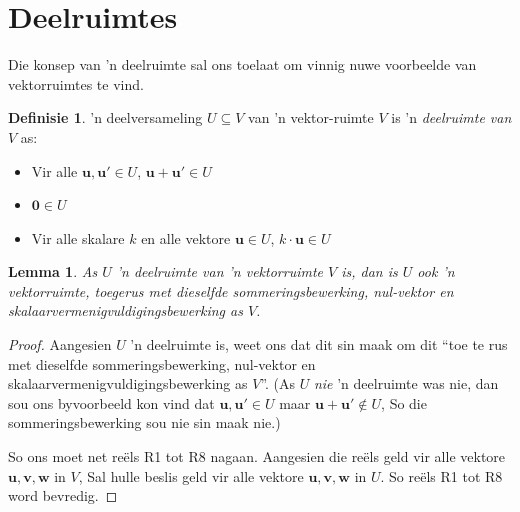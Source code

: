 \documentclass[a4paper,11pt]{book}
\newtheorem{lemma}[theorem]{Lemma}
\theoremstyle{definition}
\newtheorem{definition}[theorem]{Definisie}
\newcommand{\ve}[1]{\mathbf{#1}}
\begin{document}
\section{Deelruimtes}
Die konsep van 'n deelruimte sal ons toelaat om vinnig nuwe voorbeelde van
vektorruimtes te vind.
\begin{definition}'n deelversameling $U \subseteq V$ van 'n vektor-ruimte
	$V$ is 'n \emph{deelruimte van $V$} as:
	\begin{itemize}
		\item Vir alle $\ve{u}, \ve{u}' \in U$, $\ve{u}+\ve{u}' \in U$
		\item $\ve{0} \in U$
		\item Vir alle skalare $k$ en alle vektore $\ve{u} \in U$, $k \cdot
			\ve{u} \in U$
	\end{itemize}
\end{definition}
\begin{lemma} As $U$ 'n deelruimte van 'n vektorruimte $V$ is, dan is $U$
	ook 'n vektorruimte, toegerus met dieselfde sommeringsbewerking,
	nul-vektor en skalaarvermenigvuldigingsbewerking as $V$.
	\label{subspace_lem}
\end{lemma}
\begin{proof} Aangesien $U$ 'n deelruimte is, weet ons dat dit sin maak om
	dit ``toe te rus met dieselfde sommeringsbewerking, nul-vektor en
	skalaarvermenigvuldigingsbewerking as $V$''. (As $U$ \emph{ nie} 'n
	deelruimte was nie, dan sou ons byvoorbeeld kon vind dat $\ve{u},
	\ve{u}' \in U$ maar $\ve{u}+\ve{u}' \notin U$, So die
	sommeringsbewerking sou nie sin maak nie.)

	So ons moet net re{\"e}ls R1 tot R8 nagaan. Aangesien die re{\"e}ls
	geld vir alle vektore $\ve{u}, \ve{v}, \ve{w}$ in $V$, Sal hulle beslis
	geld vir alle vektore $\ve{u}, \ve{v}, \ve{w}$ in $U$. So re{\"e}ls R1
	tot R8 word bevredig.
\end{proof}
\end{document}

